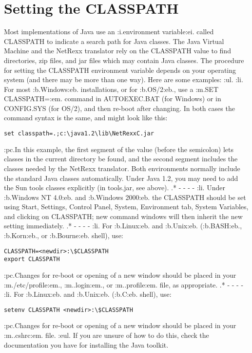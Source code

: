 \chapter{Setting the CLASSPATH}
Most implementations of Java use an :i.environment variable:ei. called
CLASSPATH to indicate a search path for Java classes.  The Java Virtual
Machine and the NetRexx translator rely on the CLASSPATH value to find
directories, zip files, and jar files which may contain Java classes.
\newline
The procedure for setting the CLASSPATH environment variable depends on
your operating system (and there may be more than one way).  Here are
some examples:
:ul.
:li.
For most :b.Windows:eb. installations, or for :b.OS/2:eb., use a :m.SET
CLASSPATH=:em. command in AUTOEXEC.BAT (for Windows) or in CONFIG.SYS
(for OS/2), and then re-boot after changing.  In both cases the command
syntax is the same, and might look like this:
\begin{verbatim}
set classpath=.;c:\java1.2\lib\NetRexxC.jar
\end{verbatim}
:pc.In this example, the first segment of the value (before the semicolon)
lets classes in the current directory be found, and the second segment
includes the classes needed by the NetRexx translator.  Both
environments normally include the standard Java classes automatically.
Under Java 1.2, you may need to add the Sun tools classes explicitly (in
tools.jar, see above).
.* - - - -
:li.
Under :b.Windows NT 4.0:eb. and :b.Windows 2000:eb. the CLASSPATH should
be set using Start, Settings, Control Panel, System, Environment tab,
System Variables, and clicking on CLASSPATH; new command windows will
then inherit the new setting immediately.
.* - - - -
:li.
For :b.Linux:eb. and :b.Unix:eb. (:b.BASH:eb., :b.Korn:eb., or
:b.Bourne:eb. shell), use:
\begin{verbatim}
CLASSPATH=<newdir>:\$CLASSPATH
export CLASSPATH
\end{verbatim}
:pc.Changes for re-boot or opening of a new window should be placed
in your :m./etc/profile:em., :m..login:em., or :m..profile:em. file, as
appropriate.
.* - - - -
:li.
For :b.Linux:eb. and :b.Unix:eb.
(:b.C:eb. shell), use:
\begin{verbatim}
setenv CLASSPATH <newdir>:\$CLASSPATH
\end{verbatim}
:pc.Changes for re-boot or opening of a new window should be
placed in your :m..cshrc:em. file.
:eul.
\newline
If you are unsure of how to do this, check the documentation you have
for installing the Java toolkit.
